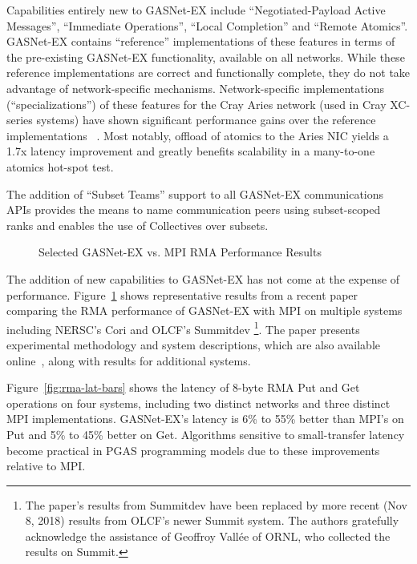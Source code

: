 Capabilities entirely new to GASNet-EX include ``Negotiated-Payload Active
Messages'', ``Immediate Operations'', ``Local Completion'' and ``Remote
Atomics''.  GASNet-EX contains ``reference'' implementations of these features
in terms of the pre-existing GASNet-EX functionality, available on all
networks.  While these reference implementations are correct and functionally
complete, they do not take advantage of network-specific mechanisms.
Network-specific implementations (``specializations'') of these features for
the Cray Aries network (used in Cray XC-series systems) have shown significant
performance gains over the reference implementations ~\cite{gasnet-aries}.
%
Most notably, offload of atomics to the Aries NIC yields a 1.7x latency improvement
and greatly benefits scalability in a many-to-one atomics hot-spot
test.

The addition of ``Subset Teams'' support to all GASNet-EX communications APIs
provides the means to name communication peers using subset-scoped ranks and
enables the use of Collectives over subsets.


\begin{figure}[htb]
  \centering
  \caption{\label{fig:gasnet-ex-rma} Selected GASNet-EX vs. MPI RMA Performance Results}
\end{figure}

The addition of new capabilities to GASNet-EX has not come at the expense of
performance.
Figure~\ref{fig:gasnet-ex-rma} shows representative results from a
recent paper~\cite{gasnet-lcpc18} comparing
the RMA performance of GASNet-EX with MPI on multiple systems including
NERSC's Cori and OLCF's Summitdev%
\footnote{The paper's results from Summitdev
have been replaced by more recent (Nov 8, 2018) results from OLCF's newer Summit system.  The authors
gratefully acknowledge the assistance of Geoffroy Vall\'ee of ORNL, who
collected the results on Summit.}.
%
The paper presents experimental methodology and system descriptions, which are
also available online~\cite{gasnet-site}, along with results for additional
systems.

Figure~\ref{fig:rma-lat-bars} shows the latency of 8-byte RMA Put and Get operations on
four systems, including two distinct networks and three distinct MPI
implementations.
%
GASNet-EX's latency is 6\% to 55\% better than MPI's on Put and 5\% to 45\%
better on Get.
%
Algorithms sensitive to small-transfer latency become practical in PGAS
programming models due to these improvements relative to MPI.


